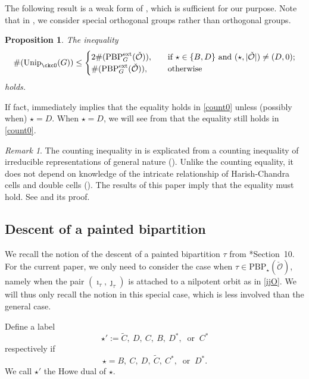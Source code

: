 \documentclass[11pt,a4paper]{amsart}
\newcommand{\CO}{{\mathcal {O}}}
\newcommand{\be}{\begin {equation}}
\newcommand{\ee}{\end {equation}}
\numberwithin{equation}{section}
\newtheorem{prop}[thm]{Proposition}
\theoremstyle{remark}
\newtheorem*{remark}{Remark}
\def\Unip{\mathrm{Unip}}
\begin{document}
The following result is a weak form of \cite[Theorem 2.28]{BMSZa}, which is sufficient for our purpose. Note that in \cite{BMSZa}, we consider special orthogonal groups rather than orthogonal groups. 

\begin{prop}\label{thmcount}
The inequality 
\be\label{count0}
 \#(\Unip_{\ckcO}(G))\leq \begin{cases}
2  \#(\mathrm{PBP}^{\mathrm{ext}}_G(\check \CO)),&\quad  \text{if  $\star\in \{B,D\}$ and $(\star, |\check \CO|)\neq (D, 0)$;}\\
 \#(\mathrm{PBP}^{\mathrm{ext}}_G(\check \CO)),  &\quad  \text{otherwise }\\
\end{cases}
\ee
holds. 
\end{prop}
If fact, \cite[Theorem 2.28]{BMSZa} immediately implies that the equality holds in \eqref{count0} unless (possibly when) $\star=D$. When $\star=D$, we will see from  that the  equality still holds in \eqref{count0}. 

\begin{remark} The counting inequality in  is explicated from a counting inequality of irreducible representations of general nature (\cite[Corollary 5.4]{BMSZa}). Unlike the counting equality, it does not depend on knowledge of the intricate relationship of Harish-Chandra cells and double cells (\cite[Section 4.5]{BMSZa}). The results of this paper imply that the equality must hold. See  and its proof. 
\end{remark}


\subsection{Descent of a painted bipartition}
\label{sec:desc}
We recall the notion of the descent of a painted bipartition $\tau$ from \cite{BMSZa}*{Section~10}. 
For the current paper, we only need to consider the case when $\tau\in \mathrm{PBP}_\star(\check \CO)$, namely when the pair $(\imath_\tau, \jmath_\tau)$ is attached to a nilpotent orbit as in \eqref{ijO}. 
 We will thus only recall the notion in this special case, which is less involved than the general case. 
 

Define a label
\[
\star':=\widetilde{C}, \ D, \  C, \ B, \ D^*,\  \textrm{ or } \ C^*
\]
respectively if
\[
\star=B,\  C, \ D, \ \widetilde{C}, \ C^*, \ \textrm{ or }\  D^*.
\]
We call $\star'$ the Howe dual of $\star$.
\end{document}
